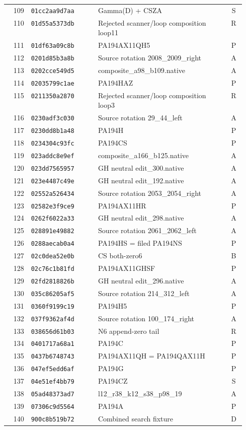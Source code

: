 \begin{longtable}{@{}r l p{0.55\linewidth} c@{}}
109 & \texttt{01cc2aa9d7aa} & Gamma(D) + CSZA & S \\
110 & \texttt{01d55a5373db} & Rejected scanner/loop composition loop11 & R \\
111 & \texttt{01df63a09c8b} & PA194AX11QH5 & P \\
112 & \texttt{0201d85b3a8b} & Source rotation 2008\_2009\_right & A \\
113 & \texttt{0202cce549d5} & composite\_a98\_b109.native & A \\
114 & \texttt{02035799c1ae} & PA194HAZ & P \\
115 & \texttt{0211350a2870} & Rejected scanner/loop composition loop3 & R \\
116 & \texttt{0230adf3c030} & Source rotation 29\_44\_left & A \\
117 & \texttt{0230dd8b1a48} & PA194H & P \\
118 & \texttt{0234304c93fc} & PA194CS & P \\
119 & \texttt{023addc8e9ef} & composite\_a166\_b125.native & A \\
120 & \texttt{023dd7565957} & GH neutral edit\_300.native & A \\
121 & \texttt{023e4487c49e} & GH neutral edit\_192.native & A \\
122 & \texttt{02552a526434} & Source rotation 2053\_2054\_right & A \\
123 & \texttt{02582e3f9ce9} & PA194AX11HR & P \\
124 & \texttt{0262f6022a33} & GH neutral edit\_298.native & A \\
125 & \texttt{028891e49882} & Source rotation 2061\_2062\_left & A \\
126 & \texttt{0288aecab0a4} & PA194HS = filed PA194NS & P \\
127 & \texttt{02c0dea52e0b} & CS both-zero6 & B \\
128 & \texttt{02c76c1b81fd} & PA194AX11GHSF & P \\
129 & \texttt{02fd2818826b} & GH neutral edit\_296.native & A \\
130 & \texttt{035c86205af5} & Source rotation 214\_312\_left & A \\
131 & \texttt{0360f9199c19} & PA194H5 & P \\
132 & \texttt{037f9362af4d} & Source rotation 100\_174\_right & A \\
133 & \texttt{038656d61b03} & N6 append-zero tail & R \\
134 & \texttt{0401717a68a1} & PA194C & P \\
135 & \texttt{0437b6748743} & PA194AX11QH = PA194QAX11H & P \\
136 & \texttt{047ef5edd6af} & PA194G & P \\
137 & \texttt{04e51ef4bb79} & PA194CZ & S \\
138 & \texttt{05ad48373ad7} & l12\_r38\_k12\_s38\_p98\_19 & A \\
139 & \texttt{07306c9d5564} & PA194A & P \\
140 & \texttt{900c8b519b72} & Combined search fixture & D \\
\bottomrule\end{longtable}
\endgroup
